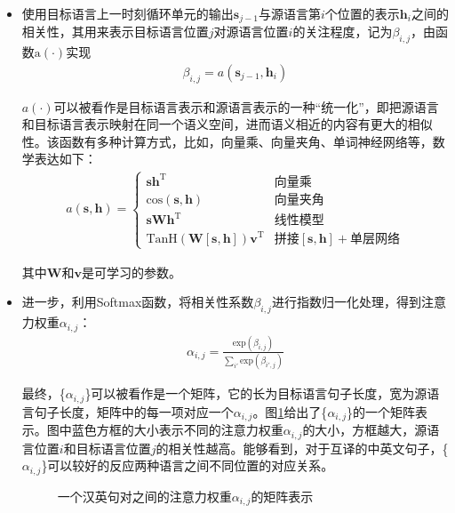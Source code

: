 \begin{itemize}
\vspace{0.5em}
\item	使用目标语言上一时刻循环单元的输出$\mathbf{s}_{j-1}$与源语言第$i$个位置的表示$\mathbf{h}_i$之间的相关性，其用来表示目标语言位置$j$对源语言位置$i$的关注程度，记为$\beta_{i,j}$，由函数$\textrm{a}(\cdot)$实现
\begin{eqnarray}
\beta_{i,j} = a(\mathbf{s}_{j-1},\mathbf{h}_i)
\label{eq:6-23}
\end{eqnarray}

$a(\cdot)$可以被看作是目标语言表示和源语言表示的一种``统一化''，即把源语言和目标语言表示映射在同一个语义空间，进而语义相近的内容有更大的相似性。该函数有多种计算方式，比如，向量乘、向量夹角、单词神经网络等，数学表达如下：
\begin{eqnarray}
a (\mathbf{s},\mathbf{h}) =  \left\{ \begin{array}{ll}
    \mathbf{s} \mathbf{h}^{\textrm{T}} & \textrm{向量乘} \\
    \textrm{cos}(\mathbf{s}, \mathbf{h}) & \textrm{向量夹角} \\
    \mathbf{s} \mathbf{W} \mathbf{h}^{\textrm{T}} & \textrm{线性模型} \\
    \textrm{TanH}(\mathbf{W}[\mathbf{s},\mathbf{h}])\mathbf{v}^{\textrm{T}} & \textrm{拼接}[\mathbf{s},\mathbf{h}]+\textrm{单层网络}
    \end{array}
    \right.
\label{eq:6-24}
\end{eqnarray}

其中$\mathbf{W}$和$\mathbf{v}$是可学习的参数。
\vspace{0.5em}
\item	进一步，利用Softmax函数，将相关性系数$\beta_{i,j}$进行指数归一化处理，得到注意力权重$\alpha_{i,j}$：
\vspace{0.5em}
\begin{eqnarray}
\alpha_{i,j}=\frac{\textrm{exp}(\beta_{i,j})} {\sum_{i'} \textrm{exp}(\beta_{i',j})}
\label{eq:6-25}
\end{eqnarray}
\vspace{0.5em}

最终，\{$\alpha_{i,j}$\}可以被看作是一个矩阵，它的长为目标语言句子长度，宽为源语言句子长度，矩阵中的每一项对应一个$\alpha_{i,j}$。图\ref{fig:6-24}给出了\{$\alpha_{i,j}$\}的一个矩阵表示。图中蓝色方框的大小表示不同的注意力权重$\alpha_{i,j}$的大小，方框越大，源语言位置$i$和目标语言位置$j$的相关性越高。能够看到，对于互译的中英文句子，\{$\alpha_{i,j}$\}可以较好的反应两种语言之间不同位置的对应关系。

\begin{figure}[htp]
\centering

\caption{一个汉英句对之间的注意力权重{$\alpha_{i,j}$}的矩阵表示}
\label{fig:6-24}
\end{figure}

\vspace{0.5em}
\end{itemize}

